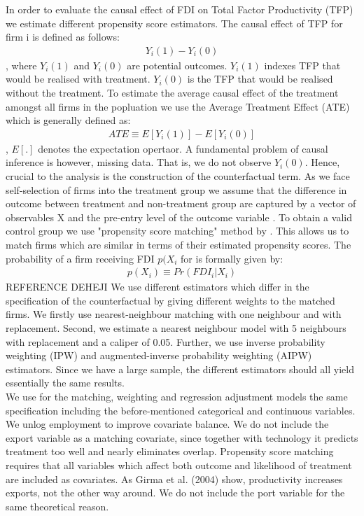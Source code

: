 \documentclass[a4paper,11pt]{scrartcl}
\begin{document}
In order to evaluate the causal effect of FDI on Total Factor Productivity (TFP) we estimate different propensity score estimators. The causal effect of TFP for firm i is defined as follows: 
\begin{align*}
Y_{i}(1) - Y_{i}(0)
\end{align*},
where $Y_{i}(1)$ and $Y_{i}(0)$ are potential outcomes. $Y_{i}(1)$ indexes TFP that would be realised with treatment. $Y_{i}(0)$ is the TFP that would be realised without the treatment. To estimate the average causal effect of the treatment amongst all firms in the popluation we use the Average Treatment Effect (ATE) which is generally defined as: 
\begin{align*}
ATE \equiv E[Y_{i}(1)] - E[Y_{i}(0)]
\end{align*}, 
$E[.]$ denotes the expectation opertaor. A fundamental problem of causal inference is however, missing data. That is, we do not observe $Y_{i}(0)$. Hence, crucial to the analysis is the construction of the counterfactual term. As we face self-selection of firms into the treatment group we assume that the difference in outcome between treatment and non-treatment group are captured by a vector of observables X and the pre-entry level of the outcome variable \citep[][compare]{dehejia2002}. 
To obtain a valid control group we use "propensity score matching" method by \citet{rosenbaum1983}. This allows us to match firms which are similar in terms of their estimated propensity scores.
The probability of a firm receiving FDI $p(X_ {i}$ for is formally given by: 
\begin{align*}
p(X_{i})  \equiv  Pr(FDI_{i}|X_{i})
\end{align*} REFERENCE {DEHEJI}
We use different estimators which differ in the specification of the counterfactual by giving different weights to the matched firms. We firstly use nearest-neighbour matching with one neighbour and with replacement. Second, we estimate a nearest neighbour model with 5 neighbours with replacement and a caliper of 0.05. Further, we use  inverse probability weighting (IPW) and augmented-inverse probability weighting (AIPW) estimators. Since we have a large sample, the different estimators should all yield essentially the same results.\\
We use for the matching, weighting and regression adjustment models the same specification including the before-mentioned categorical and continuous variables. We unlog employment to improve covariate balance. We do not include the export variable as a matching covariate, since together with technology it predicts treatment too well and nearly eliminates overlap. 
Propensity score matching requires that all variables which affect both outcome and likelihood of treatment are included as covariates. As Girma et al. (2004) show, productivity increases exports, not the other way around. %
We do not include the port variable for the same theoretical reason. 
\end{document}
